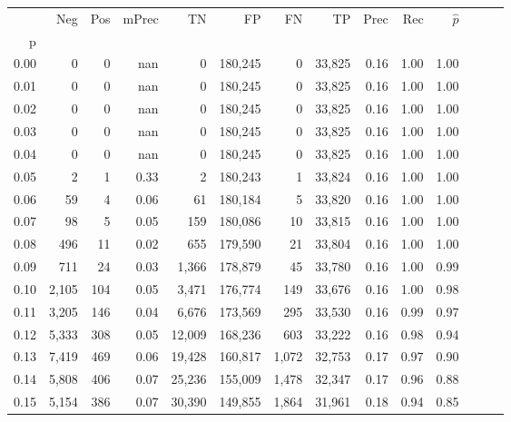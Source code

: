 \begin{tabular}{rrrrrrrrrrrrrr}
\toprule
{} &     Neg &    Pos & mPrec &       TN &       FP &      FN &      TP &  Prec &   Rec & $\hat{p}$ \\
p    &         &        &       &          &          &         &         &       &       &           \\
\midrule
0.00 &       0 &      0 &   nan &        0 &  180,245 &       0 &  33,825 &  0.16 &  1.00 &      1.00 \\
0.01 &       0 &      0 &   nan &        0 &  180,245 &       0 &  33,825 &  0.16 &  1.00 &      1.00 \\
0.02 &       0 &      0 &   nan &        0 &  180,245 &       0 &  33,825 &  0.16 &  1.00 &      1.00 \\
0.03 &       0 &      0 &   nan &        0 &  180,245 &       0 &  33,825 &  0.16 &  1.00 &      1.00 \\
0.04 &       0 &      0 &   nan &        0 &  180,245 &       0 &  33,825 &  0.16 &  1.00 &      1.00 \\
0.05 &       2 &      1 &  0.33 &        2 &  180,243 &       1 &  33,824 &  0.16 &  1.00 &      1.00 \\
0.06 &      59 &      4 &  0.06 &       61 &  180,184 &       5 &  33,820 &  0.16 &  1.00 &      1.00 \\
0.07 &      98 &      5 &  0.05 &      159 &  180,086 &      10 &  33,815 &  0.16 &  1.00 &      1.00 \\
0.08 &     496 &     11 &  0.02 &      655 &  179,590 &      21 &  33,804 &  0.16 &  1.00 &      1.00 \\
0.09 &     711 &     24 &  0.03 &    1,366 &  178,879 &      45 &  33,780 &  0.16 &  1.00 &      0.99 \\
0.10 &   2,105 &    104 &  0.05 &    3,471 &  176,774 &     149 &  33,676 &  0.16 &  1.00 &      0.98 \\
0.11 &   3,205 &    146 &  0.04 &    6,676 &  173,569 &     295 &  33,530 &  0.16 &  0.99 &      0.97 \\
0.12 &   5,333 &    308 &  0.05 &   12,009 &  168,236 &     603 &  33,222 &  0.16 &  0.98 &      0.94 \\
0.13 &   7,419 &    469 &  0.06 &   19,428 &  160,817 &   1,072 &  32,753 &  0.17 &  0.97 &      0.90 \\
0.14 &   5,808 &    406 &  0.07 &   25,236 &  155,009 &   1,478 &  32,347 &  0.17 &  0.96 &      0.88 \\
0.15 &   5,154 &    386 &  0.07 &   30,390 &  149,855 &   1,864 &  31,961 &  0.18 &  0.94 &      0.85 \\

\end{tabular}

